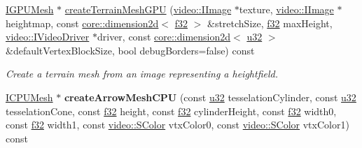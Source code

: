 \begin{DoxyCompactItemize}
\item 
\hyperlink{classirr_1_1scene_1_1IMesh}{I\+G\+P\+U\+Mesh} $\ast$ \hyperlink{classirr_1_1scene_1_1CGeometryCreator_a98e9498db779952823f9f1b5fcf7d68e}{create\+Terrain\+Mesh\+G\+PU} (\hyperlink{classirr_1_1video_1_1IImage}{video\+::\+I\+Image} $\ast$texture, \hyperlink{classirr_1_1video_1_1IImage}{video\+::\+I\+Image} $\ast$heightmap, const \hyperlink{classirr_1_1core_1_1dimension2d}{core\+::dimension2d}$<$ \hyperlink{namespaceirr_a0277be98d67dc26ff93b1a6a1d086b07}{f32} $>$ \&stretch\+Size, \hyperlink{namespaceirr_a0277be98d67dc26ff93b1a6a1d086b07}{f32} max\+Height, \hyperlink{classirr_1_1video_1_1IVideoDriver}{video\+::\+I\+Video\+Driver} $\ast$driver, const \hyperlink{classirr_1_1core_1_1dimension2d}{core\+::dimension2d}$<$ \hyperlink{namespaceirr_a0416a53257075833e7002efd0a18e804}{u32} $>$ \&default\+Vertex\+Block\+Size, bool debug\+Borders=false) const 
\begin{DoxyCompactList}\small\item\em Create a terrain mesh from an image representing a heightfield. \end{DoxyCompactList}\item 
\hyperlink{classirr_1_1scene_1_1IMesh}{I\+C\+P\+U\+Mesh} $\ast$ {\bfseries create\+Arrow\+Mesh\+C\+PU} (const \hyperlink{namespaceirr_a0416a53257075833e7002efd0a18e804}{u32} tesselation\+Cylinder, const \hyperlink{namespaceirr_a0416a53257075833e7002efd0a18e804}{u32} tesselation\+Cone, const \hyperlink{namespaceirr_a0277be98d67dc26ff93b1a6a1d086b07}{f32} height, const \hyperlink{namespaceirr_a0277be98d67dc26ff93b1a6a1d086b07}{f32} cylinder\+Height, const \hyperlink{namespaceirr_a0277be98d67dc26ff93b1a6a1d086b07}{f32} width0, const \hyperlink{namespaceirr_a0277be98d67dc26ff93b1a6a1d086b07}{f32} width1, const \hyperlink{classirr_1_1video_1_1SColor}{video\+::\+S\+Color} vtx\+Color0, const \hyperlink{classirr_1_1video_1_1SColor}{video\+::\+S\+Color} vtx\+Color1) const \hypertarget{classirr_1_1scene_1_1CGeometryCreator_ad623c74eb80d4d3375c03cff99852f16}{}\label{classirr_1_1scene_1_1CGeometryCreator_ad623c74eb80d4d3375c03cff99852f16}


\end{DoxyCompactItemize}
